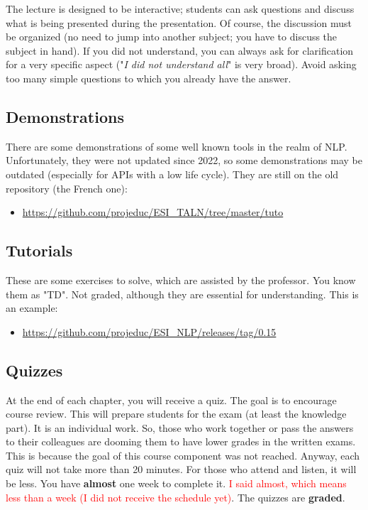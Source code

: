\documentclass[11pt, a4paper]{article}
\begin{document}
The lecture is designed to be interactive; students can ask questions and discuss what is being presented during the presentation. 
Of course, the discussion must be organized (no need to jump into another subject; you have to discuss the subject in hand).
If you did not understand, you can always ask for clarification for a very specific aspect ("\textit{I did not understand all}" is very broad). 
Avoid asking too many simple questions to which you already have the answer.

\subsection{Demonstrations}

There are some demonstrations of some well known tools in the realm of NLP. 
Unfortunately, they were not updated since 2022, so some demonstrations may be outdated (especially for APIs with a low life cycle).
They are still on the old repository (the French one):
\begin{itemize}
	\item \url{https://github.com/projeduc/ESI_TALN/tree/master/tuto}
\end{itemize}

\subsection{Tutorials}

These are some exercises to solve, which are assisted by the professor.
You know them as "TD". 
Not graded, although they are essential for understanding.
This is an example:
\begin{itemize}
	\item \url{https://github.com/projeduc/ESI_NLP/releases/tag/0.15}
\end{itemize}

\subsection{Quizzes}

At the end of each chapter, you will receive a quiz.
The goal is to encourage course review. 
This will prepare students for the exam (at least the knowledge part).
It is an individual work.
So, those who work together or pass the answers to their colleagues are dooming them to have lower grades in the written exams.
This is because the goal of this course component was not reached.
%
Anyway, each quiz will not take more than 20 minutes.
For those who attend and listen, it will be less.
You have \textbf{almost} one week to complete it. 
\textcolor{red}{I said almost, which means less than a week (I did not receive the schedule yet)}.
The quizzes are \textbf{graded}.
\end{document}
